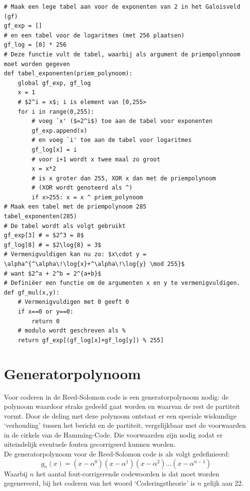 \documentclass{article}
\begin{document}
\begin{verbatim}
# Maak een lege tabel aan voor de exponenten van 2 in het Galoisveld (gf)
gf_exp = []
# en een tabel voor de logaritmes (met 256 plaatsen)
gf_log = [0] * 256
# Deze functie vult de tabel, waarbij als argument de priempolynnoom moet worden gegeven
def tabel_exponenten(priem_polynoom):
    global gf_exp, gf_log
    x = 1
    # $2^i = x$; i is element van [0,255>
    for i in range(0,255):
        # voeg `x' ($=2^i$) toe aan de tabel voor exponenten
        gf_exp.append(x)
        # en voeg `i' toe aan de tabel voor logaritmes
        gf_log[x] = i
        # voor i+1 wordt x twee maal zo groot
        x = x*2
        # is x groter dan 255, XOR x dan met de priempolynoom
        # (XOR wordt genoteerd als ^)
        if x>255: x = x ^ priem_polynoom
# Maak een tabel met de priempolynoom 285
tabel_exponenten(285)
# De tabel wordt als volgt gebruikt
gf_exp[3] # = $2^3 = 8$
gf_log[8] # = $2\log{8} = 3$
# Vermenigvuldigen kan nu zo: $x\cdot y = \alpha^{^\alpha\!\log{x}+^\alpha\!\log{y} \mod 255}$
# want $2^a + 2^b = 2^{a+b}$
# Definiëer een functie om de argumenten x en y te vermenigvuldigen.
def gf_mul(x,y):
    # Vermenigvuldigen met 0 geeft 0
    if x==0 or y==0:
        return 0
    # modulo wordt geschreven als %
    return gf_exp[(gf_log[x]+gf_log[y]) % 255]
\end{verbatim}
\section*{Generatorpolynoom}
Voor coderen in de Reed-Solomon code is een generatorpolynoom nodig: de polynoom waardoor straks gedeeld gaat worden en waarvan de rest de partiteit vormt. Door de deling met deze polynoom ontstaat er een speciale wiskundige `verhouding' tussen het bericht en de partiteit, vergelijkbaar met de voorwaarden in de cirkels van de Hamming-Code. Die voorwaarden zijn nodig zodat er uiteindelijk eventuele fouten gecorrigeerd kunnen worden.\\
De generatorpolynoom voor de Reed-Solomon code is als volgt gedefinieerd:
$$g_n(x)=(x-\alpha^0)(x-\alpha^1)(x-\alpha^2) ... (x-\alpha^{n-1})$$
Waarbij $n$ het aantal fout-corrigerende codewoorden is dat moet worden gegenereerd, bij het coderen van het woord `Coderingstheorie' is $n$ gelijk aan 22.
\end{document}
